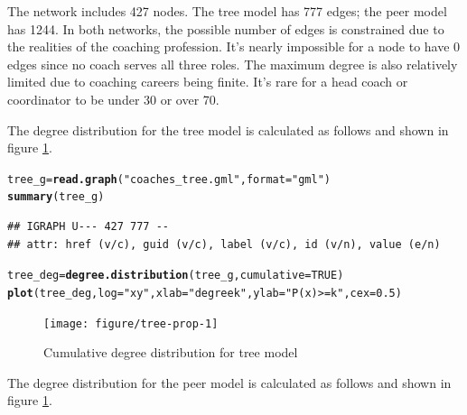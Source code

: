 \documentclass[11pt]{article}\usepackage[]{graphicx}\usepackage[]{color}
\makeatletter
\newcommand{\hlnum}[1]{\textcolor[rgb]{0.686,0.059,0.569}{#1}}%
\newcommand{\hlstr}[1]{\textcolor[rgb]{0.192,0.494,0.8}{#1}}%
\newcommand{\hlstd}[1]{\textcolor[rgb]{0.345,0.345,0.345}{#1}}%
\newcommand{\hlkwb}[1]{\textcolor[rgb]{0.69,0.353,0.396}{#1}}%
\newcommand{\hlkwc}[1]{\textcolor[rgb]{0.333,0.667,0.333}{#1}}%
\newcommand{\hlkwd}[1]{\textcolor[rgb]{0.737,0.353,0.396}{\textbf{#1}}}%
\newenvironment{kframe}{%
 \def\at@end@of@kframe{}%
 \ifinner\ifhmode%
  \def\at@end@of@kframe{\end{minipage}}%
  \begin{minipage}{\columnwidth}%
 \fi\fi%
 \def\FrameCommand##1{\hskip\@totalleftmargin \hskip-\fboxsep
 \colorbox{shadecolor}{##1}\hskip-\fboxsep
     \hskip-\linewidth \hskip-\@totalleftmargin \hskip\columnwidth}%
 \MakeFramed {\advance\hsize-\width
   \@totalleftmargin\z@ \linewidth\hsize
   \@setminipage}}%
 {\par\unskip\endMakeFramed%
 \at@end@of@kframe}
\newenvironment{knitrout}{}{} %
\makeatother
\begin{document}
The network includes 427 nodes.  The tree model has 777 edges; the peer model
has 1244.  In both networks, the possible number of edges is constrained due to
the realities of the coaching profession.  It's nearly impossible for a node to
have 0 edges since no coach serves all three roles.  The maximum degree is also
relatively limited due to coaching careers being finite.  It's rare for a head
coach or coordinator to be under 30 or over 70.



The degree distribution for the tree model is calculated as follows and shown in figure \ref{fig:tree-prop}.

\begin{knitrout}
\color{fgcolor}\begin{kframe}
\begin{alltt}
\hlstd{tree_g} \hlkwb{=} \hlkwd{read.graph}\hlstd{(}\hlstr{"coaches_tree.gml"}\hlstd{,}\hlkwc{format}\hlstd{=}\hlstr{"gml"}\hlstd{)}
\hlkwd{summary}\hlstd{(tree_g)}
\end{alltt}
\begin{verbatim}
## IGRAPH U--- 427 777 -- 
## attr: href (v/c), guid (v/c), label (v/c), id (v/n), value (e/n)
\end{verbatim}
\begin{alltt}
\hlstd{tree_deg} \hlkwb{=} \hlkwd{degree.distribution}\hlstd{(tree_g,} \hlkwc{cumulative} \hlstd{=} \hlnum{TRUE}\hlstd{)}
\hlkwd{plot}\hlstd{(tree_deg,}\hlkwc{log}\hlstd{=}\hlstr{"xy"}\hlstd{,}\hlkwc{xlab}\hlstd{=}\hlstr{"degree k"}\hlstd{,}\hlkwc{ylab}\hlstd{=}\hlstr{"P(x) >= k"}\hlstd{,}\hlkwc{cex}\hlstd{=}\hlnum{0.5}\hlstd{)}
\end{alltt}
\end{kframe}\begin{figure}

{\centering \texttt{[image: figure/tree-prop-1]} 

}

\caption[Cumulative degree distribution for tree model]{Cumulative degree distribution for tree model\label{fig:tree-prop}}
\end{figure}


\end{knitrout}

The degree distribution for the peer model is calculated as follows and shown
in figure \ref{fig:tree-prop}.
\end{document}
